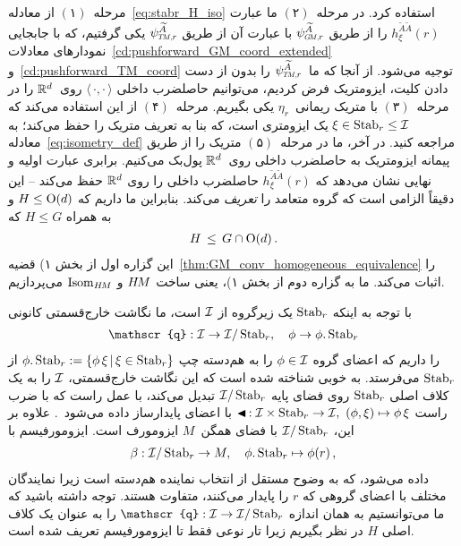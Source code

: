 مرحله~$(۱)$ از معادله~\eqref{eq:stabr_H_iso} استفاده کرد.
در مرحله~$(۲)$ ما عبارت $h_\xi^{\widetilde{A}\widetilde{A}}(r)$ را از طریق $\psiGMr^{\widetilde{A}}$ با عبارت آن از طریق $\psiTMr^{\widetilde{A}}$ یکی گرفتیم، که با جابجایی نمودارهای معادلات~\eqref{cd:pushforward_GM_coord_extended} و~\eqref{cd:pushforward_TM_coord} توجیه می‌شود.
از آنجا که ما~$\psiTMr^{\widetilde{A}}$ را بدون از دست دادن کلیت، ایزومتریک فرض کردیم، می‌توانیم حاصلضرب داخلی $\langle\,\cdot,\cdot\,\rangle$ روی~$\mathbb{R}^d$ را در مرحله~$(۳)$ با متریک ریمانی~$\eta_r$ یکی بگیریم.
مرحله~$(۴)$ از این استفاده می‌کند که $\xi \in \operatorname{Stab}_{r} \leq \mathcal{I}$ یک ایزومتری است، که بنا به تعریف متریک را حفظ می‌کند؛ به معادله~\eqref{eq:isometry_def} مراجعه کنید.
در آخر، ما در مرحله~$(۵)$ متریک را از طریق پیمانه ایزومتریک به حاصلضرب داخلی روی~$\mathbb{R}^d$ پول‌بک می‌کنیم.
برابری عبارت اولیه و نهایی نشان می‌دهد که $h_\xi^{\widetilde{A}\widetilde{A}}(r)$ حاصلضرب داخلی را روی $\mathbb{R}^d$ حفظ می‌کند -- این دقیقاً الزامی است که گروه متعامد را \emph{تعریف} می‌کند.
بنابراین ما داریم که $H\leq \operatorname{O}(d)$ و به همراه $H\leq G$ که
\begin{align}
	H \,\leq\, G \cap \operatorname{O}(d) \,.
\end{align}
این گزاره اول از بخش ۱) قضیه~\ref{thm:GM_conv_homogeneous_equivalence} را اثبات می‌کند.
ما به گزاره دوم از بخش ۱)، یعنی ساخت $H\mkern-2.5muM$ و $\operatorname{Isom}_{H\mkern-2.5muM}$ می‌پردازیم.

با توجه به اینکه $\operatorname{Stab}_{r}$ یک زیرگروه از $\mathcal{I}$ است، ما نگاشت خارج‌قسمتی کانونی
\begin{align}
	\mathscr{q}: \I \to \I/\Stab{r},\ \ \ \phi \to \phi.\Stab{r}
\end{align}
را داریم که اعضای گروه $\phi \in \mathcal{I}$ را به هم‌دسته چپ $\phi.\operatorname{Stab}_{r} := \{\phi\,\xi \,|\, \xi\in\operatorname{Stab}_{r} \}$ از $\operatorname{Stab}_{r}$ می‌فرستد.
به خوبی شناخته شده است که این نگاشت خارج‌قسمتی، $\mathcal{I}$ را به یک کلاف اصلی $\operatorname{Stab}_{r}$ روی فضای پایه $\mathcal{I}/\operatorname{Stab}_{r}$ تبدیل می‌کند، با عمل راست که با ضرب راست $\blacktriangleleft \,: \mathcal{I} \times \operatorname{Stab}_{r} \to \mathcal{I},\ (\phi,\xi) \mapsto \phi\,\xi$ با اعضای پایدارساز داده می‌شود~\cite{gallier2019diffgeom2,neeb2010differential}.
علاوه بر این، $\mathcal{I}/\operatorname{Stab}_{r}$ با فضای همگن~$M$ ایزومورف است.
ایزومورفیسم با
\begin{align}
	\beta: \mathcal{I}/\operatorname{Stab}_{r} \to M,\ \ \ \phi.\operatorname{Stab}_{r} \mapsto \phi(r) \,,
\end{align}
داده می‌شود، که به وضوح مستقل از انتخاب نماینده هم‌دسته است زیرا نمایندگان مختلف با اعضای گروهی که $r$ را پایدار می‌کنند، متفاوت هستند.
توجه داشته باشید که ما می‌توانستیم به همان اندازه $\mathscr{q}: \I \to \I/\Stab{r}$ را به عنوان یک کلاف اصلی $H$ در نظر بگیریم زیرا تار نوعی فقط تا ایزومورفیسم تعریف شده است.


